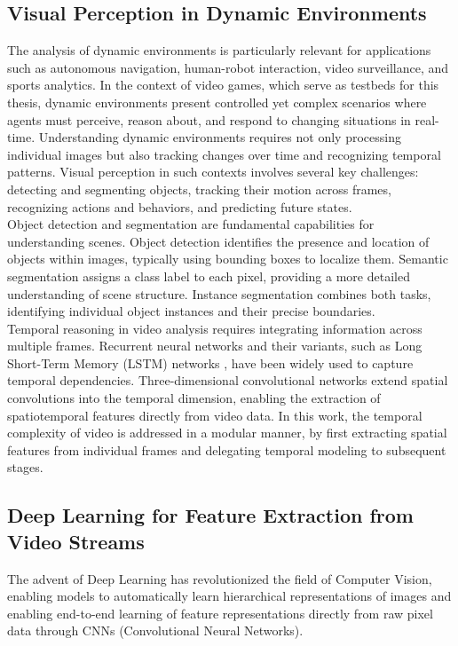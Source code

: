 \documentclass[12pt,a4paper]{report}
\begin{document}
\subsection{Visual Perception in Dynamic Environments}

The analysis of dynamic environments is particularly relevant for applications such as autonomous navigation, human-robot interaction, video surveillance, and sports analytics. In the context of video games, which serve as testbeds for this thesis, dynamic environments present controlled yet complex scenarios where agents must perceive, reason about, and respond to changing situations in real-time.
Understanding dynamic environments requires not only processing individual images but also tracking changes over time and recognizing temporal patterns. Visual perception in such contexts involves several key challenges: detecting and segmenting objects, tracking their motion across frames, recognizing actions and behaviors, and predicting future states.
\\Object detection and segmentation are fundamental capabilities for understanding scenes. Object detection identifies the presence and location of objects within images, typically using bounding boxes to localize them. Semantic segmentation assigns a class label to each pixel, providing a more detailed understanding of scene structure. Instance segmentation combines both tasks, identifying individual object instances and their precise boundaries.
\\Temporal reasoning in video analysis requires integrating information across multiple frames. Recurrent neural networks and their variants, such as Long Short-Term Memory (LSTM) networks \cite{chiave63} , have been widely used to capture temporal dependencies. Three-dimensional convolutional networks extend spatial convolutions into the temporal dimension, enabling the extraction of spatiotemporal features directly from video data.
In this work, the temporal complexity of video is addressed in a modular manner, by first extracting spatial features from individual frames and delegating temporal modeling to subsequent stages.


\subsection{Deep Learning for Feature Extraction from Video Streams}

The advent of Deep Learning has revolutionized the field of Computer Vision, enabling models to automatically learn hierarchical representations of images and enabling end-to-end learning of feature representations directly from raw pixel data through CNNs (Convolutional Neural Networks).
\end{document}

